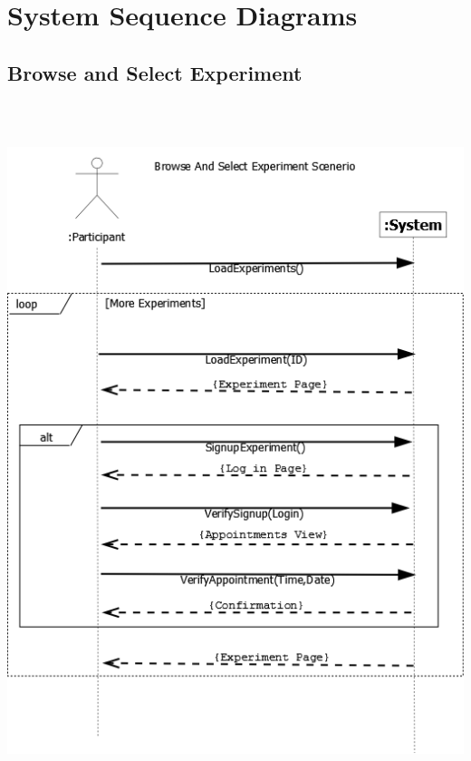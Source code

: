 \section{System Sequence Diagrams}
\subsection{Browse and Select Experiment}
\includegraphics[height=8in]{../other/System-Sequence-diagrams/Browse-experiments.png}